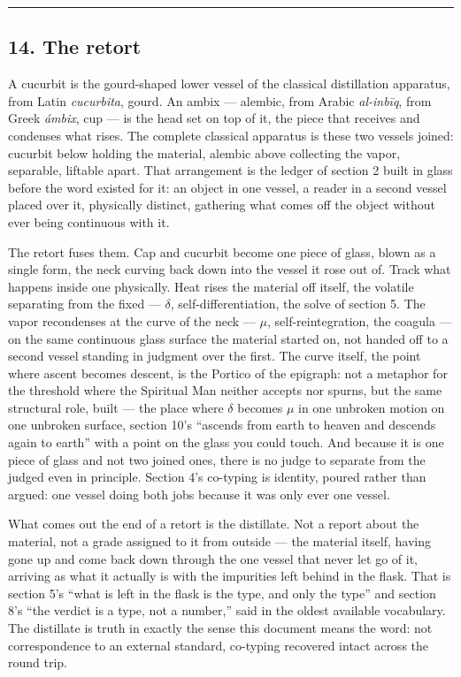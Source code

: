 \documentclass[12pt,a4paper]{article}
\begin{document}
\begin{center}\rule{0.5\linewidth}{0.5pt}\end{center}

\hypertarget{the-retort}{%
\subsection{14. The retort}\label{the-retort}}

A cucurbit is the gourd-shaped lower vessel of the classical
distillation apparatus, from Latin \emph{cucurbita}, gourd. An ambix ---
alembic, from Arabic \emph{al-inbīq}, from Greek \emph{ámbix}, cup ---
is the head set on top of it, the piece that receives and condenses what
rises. The complete classical apparatus is these two vessels joined:
cucurbit below holding the material, alembic above collecting the vapor,
separable, liftable apart. That arrangement is the ledger of section 2
built in glass before the word existed for it: an object in one vessel,
a reader in a second vessel placed over it, physically distinct,
gathering what comes off the object without ever being continuous with
it.

The retort fuses them. Cap and cucurbit become one piece of glass, blown
as a single form, the neck curving back down into the vessel it rose out
of. Track what happens inside one physically. Heat rises the material
off itself, the volatile separating from the fixed --- \({δ}\),
self-differentiation, the solve of section 5. The vapor recondenses at
the curve of the neck --- \({μ}\), self-reintegration, the coagula ---
on the same continuous glass surface the material started on, not handed
off to a second vessel standing in judgment over the first. The curve
itself, the point where ascent becomes descent, is the Portico of the
epigraph: not a metaphor for the threshold where the Spiritual Man
neither accepts nor spurns, but the same structural role, built --- the
place where \({δ}\) becomes \({μ}\) in one unbroken motion on one
unbroken surface, section 10's ``ascends from earth to heaven and
descends again to earth'' with a point on the glass you could touch. And
because it is one piece of glass and not two joined ones, there is no
judge to separate from the judged even in principle. Section 4's
co-typing is identity, poured rather than argued: one vessel doing both
jobs because it was only ever one vessel.

What comes out the end of a retort is the distillate. Not a report about
the material, not a grade assigned to it from outside --- the material
itself, having gone up and come back down through the one vessel that
never let go of it, arriving as what it actually is with the impurities
left behind in the flask. That is section 5's ``what is left in the
flask is the type, and only the type'' and section 8's ``the verdict is
a type, not a number,'' said in the oldest available vocabulary. The
distillate is truth in exactly the sense this document means the word:
not correspondence to an external standard, co-typing recovered intact
across the round trip.
\end{document}
